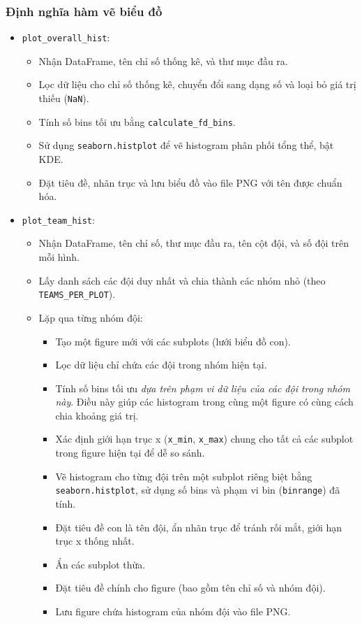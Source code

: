 \documentclass[12pt, a4paper]{report}
\begin{document}
\subsubsection*{Định nghĩa hàm vẽ biểu đồ}
\begin{itemize}
    \item \texttt{plot\_overall\_hist}:
    \begin{itemize}
        \item Nhận DataFrame, tên chỉ số thống kê, và thư mục đầu ra.
        \item Lọc dữ liệu cho chỉ số thống kê, chuyển đổi sang dạng số và loại bỏ giá trị thiếu (\texttt{NaN}).
        \item Tính số bins tối ưu bằng \texttt{calculate\_fd\_bins}.
        \item Sử dụng \texttt{seaborn.histplot} để vẽ histogram phân phối tổng thể, bật KDE.
        \item Đặt tiêu đề, nhãn trục và lưu biểu đồ vào file PNG với tên được chuẩn hóa.
    \end{itemize}
    \item \texttt{plot\_team\_hist}:
    \begin{itemize}
        \item Nhận DataFrame, tên chỉ số, thư mục đầu ra, tên cột đội, và số đội trên mỗi hình.
        \item Lấy danh sách các đội duy nhất và chia thành các nhóm nhỏ \sloppypar
    (theo \texttt{TEAMS\_PER\_PLOT}).
        \item Lặp qua từng nhóm đội:
        \begin{itemize}
            \item Tạo một figure mới với các subplots (lưới biểu đồ con).
            \item Lọc dữ liệu chỉ chứa các đội trong nhóm hiện tại.
            \item Tính số bins tối ưu \textit{dựa trên phạm vi dữ liệu của các đội trong nhóm này}. Điều này giúp các histogram trong cùng một figure có cùng cách chia khoảng giá trị.
            \item Xác định giới hạn trục x (\texttt{x\_min}, \texttt{x\_max}) chung cho tất cả các subplot trong figure hiện tại để dễ so sánh.
            \item Vẽ histogram cho từng đội trên một subplot riêng biệt bằng \texttt{seaborn.histplot}, sử dụng số bins và phạm vi bin (\texttt{binrange}) đã tính.
            \item Đặt tiêu đề con là tên đội, ẩn nhãn trục để tránh rối mắt, giới hạn trục x thống nhất.
            \item Ẩn các subplot thừa.
            \item Đặt tiêu đề chính cho figure (bao gồm tên chỉ số và nhóm đội).
            \item Lưu figure chứa histogram của nhóm đội vào file PNG.
        \end{itemize}
    \end{itemize}
\end{itemize}
\end{document}
